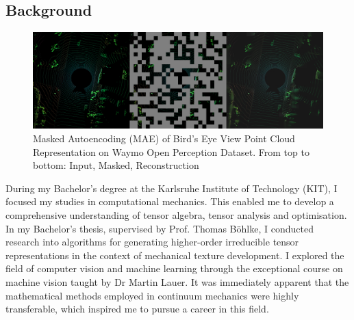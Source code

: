 


\setlength{\columnsep}{15pt}%
\setlength{\intextsep}{0pt plus 0pt minus 0pt}


\setlength{\parindent}{\myindent}

    
    \subsection{\textbf{Background}} \begin{figure}
        \includegraphics[width=330pt, angle=270]{pic/Hiera-Waymo.png}
        \mainfont\fontsize{9pt}{9pt}\selectfont\caption{ \mainfont\fontsize{9pt}{9pt}\selectfont Masked Autoencoding 
        (MAE) of Bird's Eye View Point Cloud Representation on Waymo Open Perception Dataset. From top to bottom: Input, Masked, Reconstruction}
        \label{fig:mae_img}
        \end{figure}
    
    During my Bachelor's degree at the Karlsruhe Institute of Technology (KIT), I focused my studies in computational mechanics. This enabled me to develop a comprehensive understanding of tensor algebra, tensor analysis and optimisation. In my Bachelor's thesis, supervised by Prof. Thomas Böhlke, I conducted research into algorithms for generating higher-order irreducible tensor representations in the context of mechanical texture development. I explored the field of computer vision and machine learning through the exceptional course on machine vision taught by Dr Martin Lauer. It was immediately apparent that the mathematical methods employed in continuum mechanics were highly transferable, which inspired me to pursue a career in this field.

